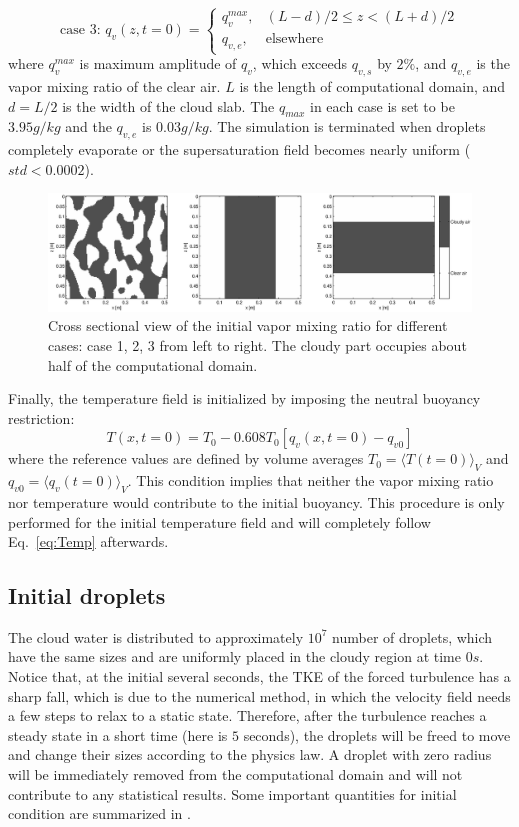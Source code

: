 \documentclass[draft,jgrga]{AGUTeX}
\newcommand{\Eq}[1]{Eq.~\eqref{#1}} \newcommand{\Fig}[1]{Figure~\ref{#1}}
\begin{document}
\begin{article}
\begin{equation}
\mbox{case 3: } q_v(z,t=0) = 
\begin{cases} 
q_v^{max}, & (L-d)/2 \le z < (L+d)/2\\
q_{v,e}, & \mbox{elsewhere}
\end{cases}\label{case3}
\end{equation}
where $q_v^{max}$ is maximum amplitude of $q_v$, which exceeds $q_{v,s}$ by $2\%$, and $q_{v,e}$ is the vapor mixing ratio of the clear air. $L$ is the length of computational domain, and $d = L/2$ is the width of the cloud slab. The $q_{max}$ in each case is set to be $3.95g/kg$ and the $q_{v,e}$ is $0.03g/kg$. The simulation is terminated when droplets completely evaporate or the supersaturation field becomes nearly uniform ($std<0.0002$).
\begin{figure}[H]
\includegraphics[width=1.0\textwidth]{Figures/v_field_case123}
\caption{Cross sectional view of the initial vapor mixing ratio for different cases: case 1, 2, 3 from left to right. The cloudy part occupies about half of the computational domain.\label{fig:v_field_case123}}
\end{figure}

Finally, the temperature field is initialized by imposing the neutral buoyancy restriction:
\begin{equation}
T(x,t = 0) = T_0 - 0.608T_0[q_v(x,t = 0) - q_{v0}]
\end{equation}
where the reference values are defined by volume averages $T_0 = \langle T(t=0)\rangle_V$ and $q_{v0} = \langle q_v(t=0)\rangle_V$. This condition implies that neither the vapor mixing ratio nor temperature would contribute to the initial buoyancy. This procedure is only performed for the initial temperature field and will completely follow \Eq{eq:Temp} afterwards.
\subsection{Initial droplets}

The cloud water is distributed to approximately $10^{7}$ number of droplets, which have the same sizes and are uniformly placed in the cloudy region at time $0s$. Notice that, at the initial several seconds, the TKE of the forced turbulence has a sharp fall, which is due to the numerical method, in which the velocity field needs a few steps to relax to a static state. Therefore, after the turbulence reaches a steady state in a short time (here is $5$ seconds), the droplets will be freed to move and change their sizes according to the physics law. A droplet with zero radius will be immediately removed from the computational domain and will not contribute to any statistical results. Some important quantities for initial condition are summarized in .


\end{article}
\end{document}
